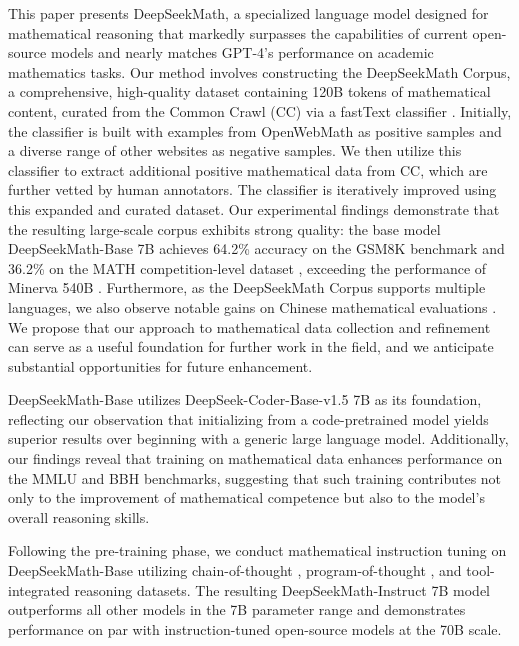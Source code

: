 This paper presents DeepSeekMath, a specialized language model designed for mathematical reasoning that markedly surpasses the capabilities of current open-source models and nearly matches GPT-4's performance on academic mathematics tasks. Our method involves constructing the DeepSeekMath Corpus, a comprehensive, high-quality dataset containing 120B tokens of mathematical content, curated from the Common Crawl (CC) via a fastText classifier \citep{joulin2016fasttext}. Initially, the classifier is built with examples from OpenWebMath \citep{openwebmath} as positive samples and a diverse range of other websites as negative samples. We then utilize this classifier to extract additional positive mathematical data from CC, which are further vetted by human annotators. The classifier is iteratively improved using this expanded and curated dataset. Our experimental findings demonstrate that the resulting large-scale corpus exhibits strong quality: the base model DeepSeekMath-Base 7B achieves 64.2\% accuracy on the GSM8K benchmark \citep{gsm8k} and 36.2\% on the MATH competition-level dataset \citep{MATH}, exceeding the performance of Minerva 540B \citep{minerva}. Furthermore, as the DeepSeekMath Corpus supports multiple languages, we also observe notable gains on Chinese mathematical evaluations \citep{wei2023cmath,agieval}. We propose that our approach to mathematical data collection and refinement can serve as a useful foundation for further work in the field, and we anticipate substantial opportunities for future enhancement.

DeepSeekMath-Base utilizes DeepSeek-Coder-Base-v1.5 7B \citep{deepseek-coder} as its foundation, reflecting our observation that initializing from a code-pretrained model yields superior results over beginning with a generic large language model. Additionally, our findings reveal that training on mathematical data enhances performance on the MMLU \citep{mmlu} and BBH \citep{bbh} benchmarks, suggesting that such training contributes not only to the improvement of mathematical competence but also to the model’s overall reasoning skills.

Following the pre-training phase, we conduct mathematical instruction tuning on DeepSeekMath-Base utilizing chain-of-thought \citep{cot}, program-of-thought \citep{pot,pal}, and tool-integrated reasoning \citep{tora} datasets. The resulting DeepSeekMath-Instruct 7B model outperforms all other models in the 7B parameter range and demonstrates performance on par with instruction-tuned open-source models at the 70B scale.

